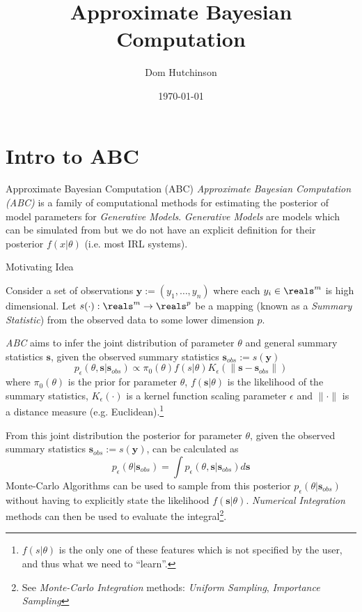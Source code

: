 \documentclass[11pt,a4paper]{article}
\begin{document}
\setcounter{section}{1}

\title{Approximate Bayesian Computation}
\author{Dom Hutchinson}
\date{\today}
\maketitle

\section*{Intro to ABC}

  \begin{definition}{Approximate Bayesian Computation (ABC)}
    \textit{Approximate Bayesian Computation (ABC)} is a family of computational methods for estimating the posterior of model parameters for \textit{Generative Models}. \textit{Generative Models} are models which can be simulated from but we do not have an explicit definition for their posterior $f(x|\theta)$ (i.e. most IRL systems).
  \end{definition}

  \begin{proposition}{Motivating Idea}
    \par Consider a set of observations $\mathbf{y}:=(y_1,\dots,y_n)$ where each $y_i\in\reals^m$ is high dimensional. Let $s(\cdot):\reals^m\to\reals^p$ be a mapping (known as a \textit{Summary Statistic}) from the observed data to some lower dimension $p$.
    \par \textit{ABC} aims to infer the joint distribution of parameter $\theta$ and general summary statistics $\mathbf{s}$, given the observed summary statistics $\mathbf{s}_{obs}:=s(\mathbf{y})$
    \[ p_\epsilon(\theta,\mathbf{s}|\mathbf{s}_{obs})\propto\pi_0(\theta)f(s|\theta)K_\epsilon(\|\mathbf{s}-\mathbf{s}_{obs}\|) \]
    where $\pi_0(\theta)$ is the prior for parameter $\theta$, $f(\mathbf{s}|\theta)$ is the likelihood of the summary statistics, $K_\epsilon(\cdot)$ is a kernel function scaling parameter $\epsilon$ and $\|\cdot\|$ is a distance measure (e.g. Euclidean).\footnote{$f(s|\theta)$ is the only one of these features which is not specified by the user, and thus what we need to ``learn''.}
    \par From this joint distribution the posterior for parameter $\theta$, given the observed summary statistics $\mathbf{s}_{obs}:=s(\mathbf{y})$, can be calculated as
    \[ p_\epsilon(\theta|\mathbf{s}_{obs})=\int p_\epsilon(\theta,\mathbf{s}|\mathbf{s}_{obs})d\mathbf{s} \]
    Monte-Carlo Algorithms can be used to sample from this posterior $p_\epsilon(\theta|\mathbf{s}_{obs})$ without having to explicitly state the likelihood $f(\mathbf{s}|\theta)$. \textit{Numerical Integration} methods can then be used to evaluate the integral\footnote{See \textit{Monte-Carlo Integration} methods: \textit{Uniform Sampling}, \textit{Importance Sampling}}.
  \end{proposition}
\end{document}
